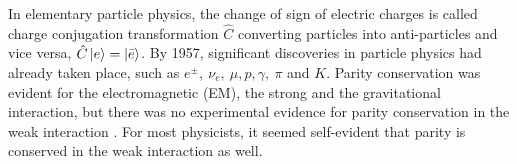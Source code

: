 In elementary particle physics, the change of sign of electric charges is called charge conjugation transformation $\hat C$ converting particles into anti-particles and vice versa, $\hat C \ket{e} = \ket{\bar e}$.
By 1957, significant discoveries in particle physics had already taken place, such as $e^\pm,\ \nu_e,\ \mu, p, \gamma,\ \pi$ and $K$.
Parity conservation was evident for the electromagnetic (EM), the strong and the gravitational interaction, but there was no experimental evidence for parity conservation in the weak interaction \cite{CaseStudies}.
For most physicists, it seemed self-evident that parity is conserved in the weak interaction as well.

